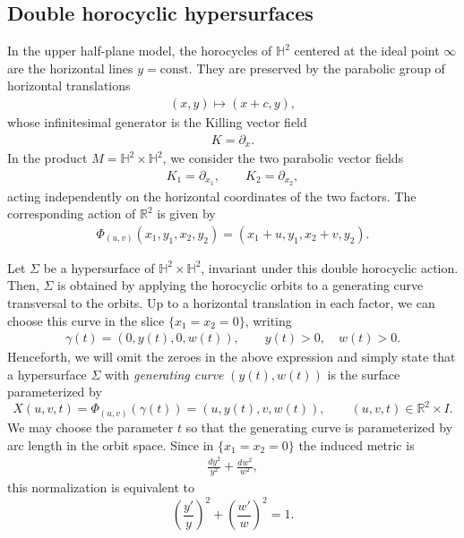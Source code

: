 \documentclass[11pt,a4paper]{amsart}
\theoremstyle{plain}
\theoremstyle{remark}
\newcommand{\R}{\mathbb{R}}
\newcommand{\Hyp}{\mathbb{H}}
\begin{document}
\subsection{Double horocyclic hypersurfaces}

In the upper half-plane model, the horocycles of $\Hyp^2$
centered at the ideal point $\infty$ are the horizontal
lines $y=\mathrm{const}$. They are preserved by the
parabolic group of horizontal translations
\begin{align*}
(x,y)\longmapsto (x+c,y),
\end{align*}
whose infinitesimal generator is the Killing vector field
\begin{align*}
K=\partial_x.
\end{align*}
In the product $M=\Hyp^2\times\Hyp^2$, we consider the two
parabolic vector fields
\begin{align*}
K_1=\partial_{x_1},\qquad K_2=\partial_{x_2},
\end{align*}
acting independently on the horizontal coordinates of the
two factors. The corresponding action of $\R^2$ is given
by
\begin{align}\label{eqaction}
\Phi_{(u,v)}(x_1,y_1,x_2,y_2) = (x_1+u,y_1,x_2+v,y_2).
\end{align}

Let $\Sigma$ be a hypersurface of $\Hyp^2\times\Hyp^2$, invariant under this double horocyclic action.
Then, $\Sigma$ is obtained by
applying the horocyclic orbits to a generating curve
transversal to the orbits. Up to a horizontal translation
in each factor, we can choose this curve in the slice
$\{x_1=x_2=0\}$, writing
\begin{align*}
\gamma(t)=(0,y(t),0,w(t)),
\qquad y(t)>0,\quad w(t)>0.
\end{align*}
Henceforth, we will omit the zeroes in the above expression
and simply state that a hypersurface $\Sigma$ with {\em generating curve}
$(y(t),w(t))$ is the surface parameterized by
\begin{equation}\label{eq:parametrizacao}
X(u,v,t) = \Phi_{(u,v)}(\gamma(t)) = (u,y(t),v,w(t)),
\qquad (u,v,t)\in\R^2\times I.
\end{equation}
We may choose the parameter $t$ so that the generating curve is
parameterized by arc length in the orbit space. Since in $\{x_1=x_2=0\}$
the induced metric is
\begin{align*}
\frac{dy^2}{y^2}+\frac{dw^2}{w^2},
\end{align*}
this normalization is equivalent to
\begin{equation}\label{eq:arco-log}
\left(\frac{y'}{y}\right)^2+\left(\frac{w'}{w}\right)^2=1.
\end{equation}
\end{document}
